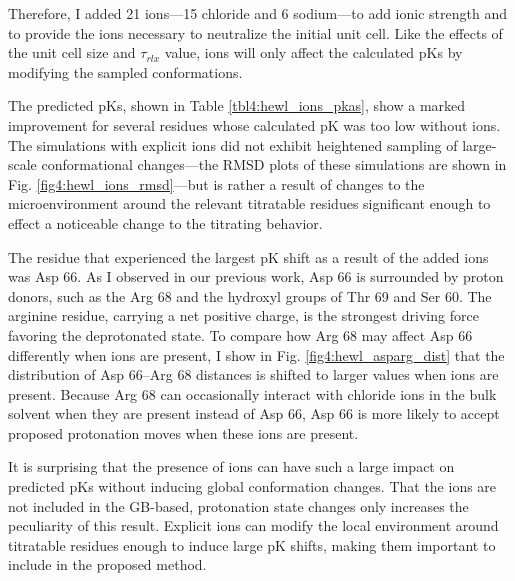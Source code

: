 Therefore, I added 21 ions---15 chloride and 6 sodium---to add ionic strength
and to provide the ions necessary to neutralize the initial unit cell. Like the
effects of the unit cell size and $\tau _ {rlx}$ value, ions will only affect
the calculated pKs by modifying the sampled conformations.

The predicted pKs, shown in Table \ref{tbl4:hewl_ions_pkas}, show a
marked improvement for several residues whose calculated pK was too low
without ions.  The simulations with explicit ions did not exhibit heightened
sampling of large-scale conformational changes---the RMSD plots of these
simulations are shown in Fig. \ref{fig4:hewl_ions_rmsd}---but is rather a result
of changes to the microenvironment around the relevant titratable residues
significant enough to effect a noticeable change to the titrating behavior.

The residue that experienced the largest pK shift as a result of the
added ions was Asp 66. As I observed in our previous work, Asp 66 is surrounded
by proton donors, such as the Arg 68 and the hydroxyl groups of Thr 69 and Ser
60. \cite{Swails_JChemTheoryComput_2012_v8_p4393} The arginine residue, carrying
a net positive charge, is the strongest driving force favoring the deprotonated
state. To compare how Arg 68 may affect Asp 66 differently when ions are
present, I show in Fig. \ref{fig4:hewl_asparg_dist} that the distribution of
Asp 66--Arg 68 distances is shifted to larger values when ions are present.
Because Arg 68 can occasionally interact with chloride ions in the bulk solvent
when they are present instead of Asp 66, Asp 66 is more likely to accept
proposed protonation moves when these ions are present.

It is surprising that the presence of ions can have such a large impact on
predicted pKs without inducing global conformation changes. That the ions
are not included in the GB-based, protonation state changes only increases the
peculiarity of this result. Explicit ions can modify the local environment
around titratable residues enough to induce large pK shifts, making them
important to include in the proposed method.

